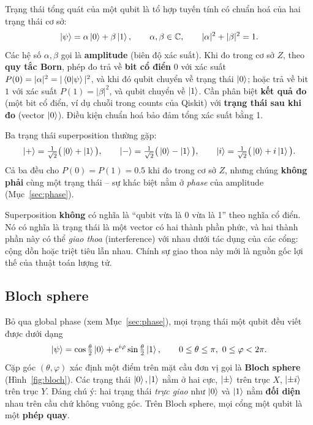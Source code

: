 Trạng thái tổng quát của một qubit là tổ hợp tuyến tính có chuẩn hoá của hai trạng thái cơ sở:
\begin{equation}
  \ket{\psi} = \alpha\ket{0} + \beta\ket{1}, \qquad
  \alpha, \beta \in \mathbb{C}, \qquad |\alpha|^2 + |\beta|^2 = 1.
  \label{eq:superposition}
\end{equation}
Các hệ số $\alpha, \beta$ gọi là \textbf{amplitude} (biên độ xác suất). Khi đo trong cơ sở $Z$, theo
\textbf{quy tắc Born}, phép đo trả về \textbf{bit cổ điển} $0$ với xác suất
$P(0) = |\alpha|^2 = |\braket{0|\psi}|^2$, và khi đó qubit chuyển về trạng thái $\ket{0}$; hoặc trả
về bit $1$ với xác suất $P(1) = |\beta|^2$, và qubit chuyển về $\ket{1}$. Cần phân biệt
\textbf{kết quả đo} (một bit cổ điển, ví dụ chuỗi  trong counts của Qiskit) với
\textbf{trạng thái sau khi đo} (vector $\ket{0}$). Điều kiện chuẩn hoá bảo đảm tổng xác suất bằng 1.

Ba trạng thái superposition thường gặp:
\begin{equation}
  \ket{+} = \tfrac{1}{\sqrt2}\big(\ket{0} + \ket{1}\big), \qquad
  \ket{-} = \tfrac{1}{\sqrt2}\big(\ket{0} - \ket{1}\big), \qquad
  \ket{i} = \tfrac{1}{\sqrt2}\big(\ket{0} + i\ket{1}\big).
  \label{eq:plusminus}
\end{equation}
Cả ba đều cho $P(0) = P(1) = 0.5$ khi đo trong cơ sở $Z$, nhưng chúng \textbf{không phải} cùng một
trạng thái -- sự khác biệt nằm ở \emph{phase} của amplitude (Mục~\ref{sec:phase}).

\begin{keybox}
Superposition \textbf{không} có nghĩa là ``qubit vừa là 0 vừa là 1'' theo nghĩa cổ điển. Nó có nghĩa
là trạng thái là một vector có hai thành phần phức, và hai thành phần này có thể \emph{giao thoa}
(interference) với nhau dưới tác dụng của các cổng: cộng dồn hoặc triệt tiêu lẫn nhau. Chính sự giao
thoa này mới là nguồn gốc lợi thế của thuật toán lượng tử.
\end{keybox}

\subsection{Bloch sphere}

Bỏ qua global phase (xem Mục~\ref{sec:phase}), mọi trạng thái một qubit đều viết được dưới dạng
\begin{equation}
  \ket{\psi} = \cos\tfrac{\theta}{2}\ket{0} + e^{i\varphi}\sin\tfrac{\theta}{2}\ket{1},
  \qquad 0 \le \theta \le \pi,\ 0 \le \varphi < 2\pi.
  \label{eq:bloch}
\end{equation}
Cặp góc $(\theta, \varphi)$ xác định một điểm trên mặt cầu đơn vị gọi là \textbf{Bloch sphere}
(Hình~\ref{fig:bloch}). Các trạng thái $\ket{0}, \ket{1}$ nằm ở hai cực, $\ket{\pm}$ trên trục $X$,
$\ket{\pm i}$ trên trục $Y$. Đáng chú ý: hai trạng thái \emph{trực giao} như $\ket{0}$ và $\ket{1}$
nằm \textbf{đối diện} nhau trên cầu chứ không vuông góc. Trên Bloch sphere, mọi cổng một qubit là một
\textbf{phép quay}.

